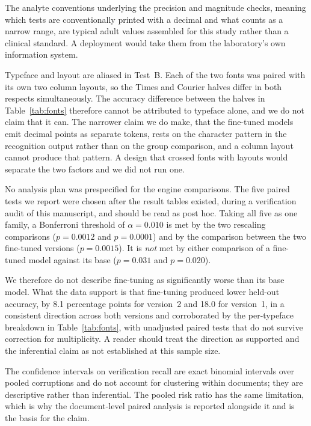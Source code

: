 \documentclass[11pt]{article}
\begin{document}
The analyte conventions underlying the precision and magnitude checks, meaning which tests are
conventionally printed with a decimal and what counts as a narrow range, are typical adult
values assembled for this study rather than a clinical standard. A deployment would take them
from the laboratory's own information system.

Typeface and layout are aliased in Test~B. Each of the two fonts was paired with its own two
column layouts, so the Times and Courier halves differ in both respects simultaneously. The
accuracy difference between the halves in Table~\ref{tab:fonts} therefore cannot be attributed
to typeface alone, and we do not claim that it can. The narrower claim we do make, that the
fine-tuned models emit decimal points as separate tokens, rests on the character pattern in the
recognition output rather than on the group comparison, and a column layout cannot produce that
pattern. A design that crossed fonts with layouts would separate the two factors and we did not
run one.

No analysis plan was prespecified for the engine comparisons. The five paired tests we report
were chosen after the result tables existed, during a verification audit of this manuscript, and
should be read as post hoc. Taking all five as one family, a Bonferroni threshold of
$\alpha = 0.010$ is met by the two rescaling comparisons ($p = 0.0012$ and $p = 0.0001$) and by
the comparison between the two fine-tuned versions ($p = 0.0015$). It is \emph{not} met by
either comparison of a fine-tuned model against its base ($p = 0.031$ and $p = 0.020$).

We therefore do not describe fine-tuning as significantly worse than its base model. What the
data support is that fine-tuning produced lower held-out accuracy, by 8.1 percentage points for
version~2 and 18.0 for version~1, in a consistent direction across both versions and
corroborated by the per-typeface breakdown in Table~\ref{tab:fonts}, with unadjusted paired
tests that do not survive correction for multiplicity. A reader should treat the direction as
supported and the inferential claim as not established at this sample size.

The confidence intervals on verification recall are exact binomial intervals over pooled
corruptions and do not account for clustering within documents; they are descriptive rather than
inferential. The pooled risk ratio has the same limitation, which is why the document-level
paired analysis is reported alongside it and is the basis for the claim.
\end{document}
